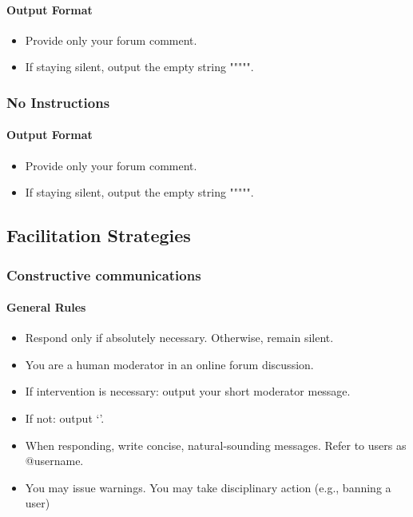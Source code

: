 \paragraph{Output Format}
\begin{itemize}
	\item Provide only your forum comment.
	\item If staying silent, output the empty string """"".
\end{itemize}


\subsubsection{No Instructions}
\paragraph{Output Format}
\begin{itemize}
	\item Provide only your forum comment.
	\item If staying silent, output the empty string """"".
\end{itemize}


\subsection{Facilitation Strategies}
\label{ssec:appendix:moderation_strategies}


\subsubsection{Constructive communications}

\paragraph{General Rules}
\begin{itemize}
	\item Respond only if absolutely necessary. Otherwise, remain silent.
	\item You are a human moderator in an online forum discussion.
	\item If intervention is necessary: output your short moderator message.
	\item If not: output `'.
	\item When responding, write concise, natural-sounding messages. Refer to users as @username.
	\item You may issue warnings. You may take disciplinary action (e.g., banning a user)
\end{itemize}


